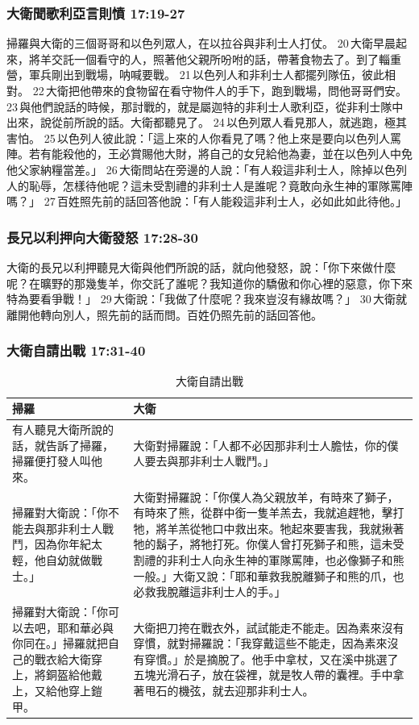 \subsubsection{大衛聞歌利亞言則憤 17:19-27}
掃羅與大衛的三個哥哥和以色列眾人，在以拉谷與非利士人打仗。 20 大衛早晨起來，將羊交託一個看守的人，照著他父親所吩咐的話，帶著食物去了。到了輜重營，軍兵剛出到戰場，呐喊要戰。 21 以色列人和非利士人都擺列隊伍，彼此相對。 22 大衛把他帶來的食物留在看守物件人的手下，跑到戰場，問他哥哥們安。 23 與他們說話的時候，那討戰的，就是屬迦特的非利士人歌利亞，從非利士隊中出來，說從前所說的話。大衛都聽見了。 24 以色列眾人看見那人，就逃跑，極其害怕。 25 以色列人彼此說：「這上來的人你看見了嗎？他上來是要向以色列人罵陣。若有能殺他的，王必賞賜他大財，將自己的女兒給他為妻，並在以色列人中免他父家納糧當差。」 26 大衛問站在旁邊的人說：「有人殺這非利士人，除掉以色列人的恥辱，怎樣待他呢？這未受割禮的非利士人是誰呢？竟敢向永生神的軍隊罵陣嗎？」 27 百姓照先前的話回答他說：「有人能殺這非利士人，必如此如此待他。」

\subsubsection{長兄以利押向大衛發怒 17:28-30}
大衛的長兄以利押聽見大衛與他們所說的話，就向他發怒，說：「你下來做什麼呢？在曠野的那幾隻羊，你交託了誰呢？我知道你的驕傲和你心裡的惡意，你下來特為要看爭戰！」 29 大衛說：「我做了什麼呢？我來豈沒有緣故嗎？」 30 大衛就離開他轉向別人，照先前的話而問。百姓仍照先前的話回答他。

\subsubsection{大衛自請出戰 17:31-40}
\begin{table}[H]
\centering 
\begin{tabular}{p{6cm}|p{}}\hline\hline
掃羅&大衛\\\hline
有人聽見大衛所說的話，就告訴了掃羅，掃羅便打發人叫他來。&
大衛對掃羅說：「人都不必因那非利士人膽怯，你的僕人要去與那非利士人戰鬥。」\\\hline
掃羅對大衛說：「你不能去與那非利士人戰鬥，因為你年紀太輕，他自幼就做戰士。」 
&大衛對掃羅說：「你僕人為父親放羊，有時來了獅子，有時來了熊，從群中銜一隻羊羔去，我就追趕牠，擊打牠，將羊羔從牠口中救出來。牠起來要害我，我就揪著牠的鬍子，將牠打死。你僕人曾打死獅子和熊，這未受割禮的非利士人向永生神的軍隊罵陣，也必像獅子和熊一般。」大衛又說：「耶和華救我脫離獅子和熊的爪，也必救我脫離這非利士人的手。」 \\\hline
掃羅對大衛說：「你可以去吧，耶和華必與你同在。」掃羅就把自己的戰衣給大衛穿上，將銅盔給他戴上，又給他穿上鎧甲。&大衛把刀挎在戰衣外，試試能走不能走。因為素來沒有穿慣，就對掃羅說：「我穿戴這些不能走，因為素來沒有穿慣。」於是摘脫了。他手中拿杖，又在溪中挑選了五塊光滑石子，放在袋裡，就是牧人帶的囊裡。手中拿著甩石的機弦，就去迎那非利士人。 \\\hline
\end{tabular}
\caption{大衛自請出戰}
\end{table}


